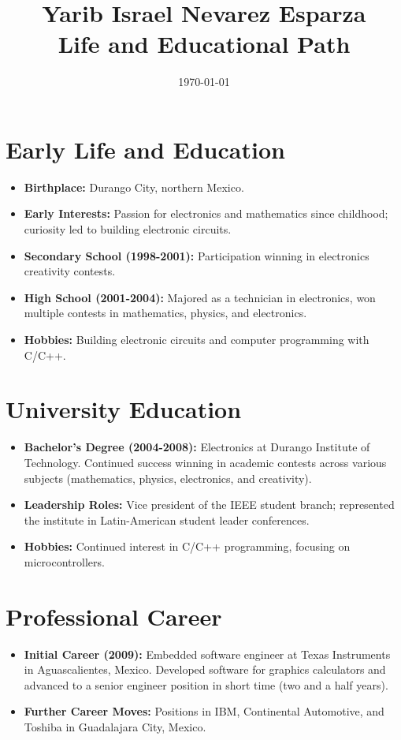 \documentclass{article}
\title{Yarib Israel Nevarez Esparza \\ Life and Educational Path}
\author{}
\date{\today}
\begin{document}
	
	\maketitle
	\vspace{-10mm} %
	
	\section*{Early Life and Education}
	\begin{itemize}
    \item \textbf{Birthplace:} Durango City, northern Mexico.
    \item \textbf{Early Interests:} Passion for electronics and mathematics since childhood; curiosity led to building electronic circuits.
    \item \textbf{Secondary School (1998-2001):} Participation winning in electronics creativity contests.
    \item \textbf{High School (2001-2004):} Majored as a technician in electronics, won multiple contests in mathematics, physics, and electronics.
    \item \textbf{Hobbies:} Building electronic circuits and computer programming with C/C++.
\end{itemize}

\section*{University Education}
\begin{itemize}[noitemsep]
    \item \textbf{Bachelor's Degree (2004-2008):} Electronics at Durango Institute of Technology. Continued success winning in academic contests across various subjects (mathematics, physics, electronics, and creativity). 
    \item \textbf{Leadership Roles:} Vice president of the IEEE student branch; represented the institute in Latin-American student leader conferences.
    \item \textbf{Hobbies:} Continued interest in C/C++ programming, focusing on microcontrollers.
\end{itemize}

\section*{Professional Career}
\begin{itemize}[noitemsep]
    \item \textbf{Initial Career (2009):} Embedded software engineer at Texas Instruments in Aguascalientes, Mexico. Developed software for graphics calculators and advanced to a senior engineer position in short time (two and a half years).
    \item \textbf{Further Career Moves:} Positions in IBM, Continental Automotive, and Toshiba in Guadalajara City, Mexico.
\end{itemize}
\end{document}

